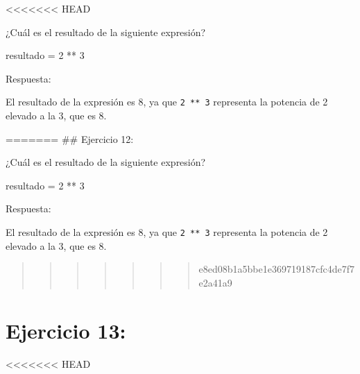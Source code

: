 \documentclass[
  a4paper,
  DIV=11,
  numbers=noendperiod,
  onepage,
  openany]{scrreprt}
\newenvironment{Shaded}{\begin{snugshade}}{\end{snugshade}}
\newcommand{\DecValTok}[1]{\textcolor[rgb]{0.68,0.00,0.00}{#1}}
\newcommand{\NormalTok}[1]{\textcolor[rgb]{0.00,0.23,0.31}{#1}}
\newcommand{\OperatorTok}[1]{\textcolor[rgb]{0.37,0.37,0.37}{#1}}
\begin{document}
\textless\textless\textless\textless\textless\textless\textless{} HEAD

¿Cuál es el resultado de la siguiente expresión?

\begin{Shaded}
\begin{Highlighting}[]
\NormalTok{resultado }\OperatorTok{=} \DecValTok{2} \OperatorTok{**} \DecValTok{3}
\end{Highlighting}
\end{Shaded}

Respuesta:

El resultado de la expresión es 8, ya que \texttt{2\ **\ 3} representa
la potencia de 2 elevado a la 3, que es 8.

======= \#\# Ejercicio 12:

¿Cuál es el resultado de la siguiente expresión?

\begin{Shaded}
\begin{Highlighting}[]
\NormalTok{resultado }\OperatorTok{=} \DecValTok{2} \OperatorTok{**} \DecValTok{3}
\end{Highlighting}
\end{Shaded}

Respuesta:

El resultado de la expresión es 8, ya que \texttt{2\ **\ 3} representa
la potencia de 2 elevado a la 3, que es 8.

\begin{quote}
\begin{quote}
\begin{quote}
\begin{quote}
\begin{quote}
\begin{quote}
\begin{quote}
e8ed08b1a5bbe1e369719187cfc4de7f7e2a41a9
\end{quote}
\end{quote}
\end{quote}
\end{quote}
\end{quote}
\end{quote}
\end{quote}

\hypertarget{ejercicio-13}{%
\chapter{Ejercicio 13:}\label{ejercicio-13}}

\textless\textless\textless\textless\textless\textless\textless{} HEAD
\end{document}
